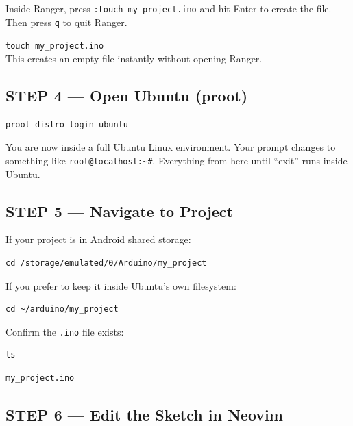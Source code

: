 \documentclass[12pt,a4paper,openany]{report}
\begin{document}
Inside Ranger, press \texttt{:touch my\_project.ino} and hit Enter to create the file. Then press \texttt{q} to quit Ranger.

\begin{tipbox}
\color{TermWhite}\ttfamily\small
\texttt{touch my\_project.ino}\\
This creates an empty file instantly without opening Ranger.
\end{tipbox}

\subsection{STEP 4 --- Open Ubuntu (proot)}

\begin{lstlisting}[style=terminal]
proot-distro login ubuntu
\end{lstlisting}

You are now inside a full Ubuntu Linux environment. Your prompt changes to something like \texttt{root@localhost:\textasciitilde\#}. Everything from here until ``exit'' runs inside Ubuntu.

\subsection{STEP 5 --- Navigate to Project}

If your project is in Android shared storage:

\begin{lstlisting}[style=shell]
cd /storage/emulated/0/Arduino/my_project
\end{lstlisting}

If you prefer to keep it inside Ubuntu's own filesystem:

\begin{lstlisting}[style=shell]
cd ~/arduino/my_project
\end{lstlisting}

Confirm the \texttt{.ino} file exists:

\begin{lstlisting}[style=shell]
ls
\end{lstlisting}

\begin{lstlisting}[style=terminal]
my_project.ino
\end{lstlisting}

\subsection{STEP 6 --- Edit the Sketch in Neovim}
\end{document}
